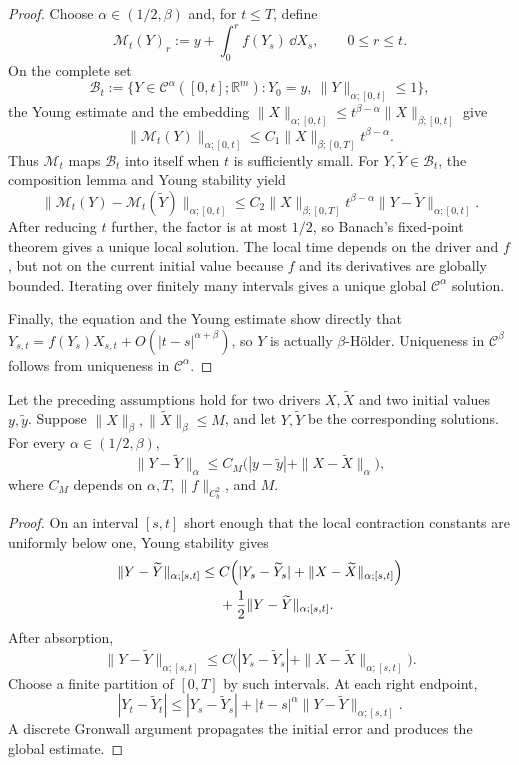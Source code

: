 \begin{proof}
Choose $\alpha\in(1/2,\beta)$ and, for $t\le T$, define
\[
 \mathcal M_t(Y)_r:=y+\int_0^r f(Y_s)\,\dd X_s,
 \qquad 0\le r\le t.
\]
On the complete set
\[
 \mathcal B_t:=\{Y\in\mathcal C^\alpha([0,t];\mathbb R^m):
  Y_0=y,\ \|Y\|_{\alpha;[0,t]}\le1\},
\]
the Young estimate and the embedding
$\|X\|_{\alpha;[0,t]}
 \le t^{\beta-\alpha}\|X\|_{\beta;[0,t]}$ give
\[
 \|\mathcal M_t(Y)\|_{\alpha;[0,t]}
 \le C_1\|X\|_{\beta;[0,T]}t^{\beta-\alpha}.
\]
Thus $\mathcal M_t$ maps $\mathcal B_t$ into itself when $t$ is sufficiently
small.  For $Y,\widetilde Y\in\mathcal B_t$, the composition lemma and Young
stability yield
\[
 \|\mathcal M_t(Y)-\mathcal M_t(\widetilde Y)\|_{\alpha;[0,t]}
 \le C_2\|X\|_{\beta;[0,T]}t^{\beta-\alpha}
       \|Y-\widetilde Y\|_{\alpha;[0,t]}.
\]
After reducing $t$ further, the factor is at most $1/2$, so Banach's fixed-point
theorem gives a unique local solution.  The local time depends on the driver
and $f$, but not on the current initial value because $f$ and its derivatives
are globally bounded.  Iterating over finitely many intervals gives a unique
global $\mathcal C^\alpha$ solution.

Finally, the equation and the Young estimate show directly that
$Y_{s,t}=f(Y_s)X_{s,t}+O(|t-s|^{\alpha+\beta})$, so $Y$ is actually
$\beta$-Hölder.  Uniqueness in $\mathcal C^\beta$ follows from uniqueness in
$\mathcal C^\alpha$.
\end{proof}

\begin{prop}
Let the preceding assumptions hold for two drivers $X,\widetilde X$ and two
initial values $y,\widetilde y$.  Suppose
$\|X\|_\beta,\|\widetilde X\|_\beta\le M$, and let $Y,\widetilde Y$ be the
corresponding solutions.  For every $\alpha\in(1/2,\beta)$,
\[
  \|Y-\widetilde Y\|_\alpha
  \le C_M\bigl(|y-\widetilde y|+
                  \|X-\widetilde X\|_\alpha\bigr),
\]
where $C_M$ depends on $\alpha,T,\|f\|_{C_b^2}$, and $M$.
\end{prop}

\begin{proof}
On an interval $[s,t]$ short enough that the local contraction constants are
uniformly below one, Young stability gives
\begin{align*}
\|Y-\widetilde Y\|_{\alpha;[s,t]}
\le{}&C\Bigl(
 |Y_s-\widetilde Y_s|
 +\|X-\widetilde X\|_{\alpha;[s,t]}\Bigr)\\
&+\frac12\|Y-\widetilde Y\|_{\alpha;[s,t]}.
\end{align*}
After absorption,
\[
 \|Y-\widetilde Y\|_{\alpha;[s,t]}
 \le C\bigl(|Y_s-\widetilde Y_s|
 +\|X-\widetilde X\|_{\alpha;[s,t]}\bigr).
\]
Choose a finite partition of $[0,T]$ by such intervals.  At each right endpoint,
\[
 |Y_t-\widetilde Y_t|
 \le |Y_s-\widetilde Y_s|
     +|t-s|^\alpha\|Y-\widetilde Y\|_{\alpha;[s,t]}.
\]
A discrete Gronwall argument propagates the initial error and produces the
global estimate.
\end{proof}

